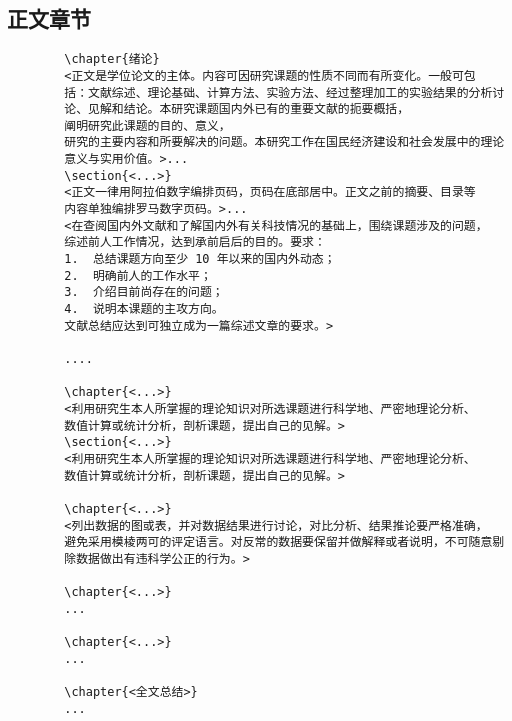 \documentclass[figurelist,tablelist,algorithmlist,nomlist,masters]{seuthesix}
\begin{document}
	\subsection{正文章节}
	{\color{magenta}
		\begin{verbatim}
		\chapter{绪论}
		<正文是学位论文的主体。内容可因研究课题的性质不同而有所变化。一般可包
		括：文献综述、理论基础、计算方法、实验方法、经过整理加工的实验结果的分析讨
		论、见解和结论。本研究课题国内外已有的重要文献的扼要概括，
		阐明研究此课题的目的、意义，
		研究的主要内容和所要解决的问题。本研究工作在国民经济建设和社会发展中的理论
		意义与实用价值。>...
		\section{<...>}
		<正文一律用阿拉伯数字编排页码，页码在底部居中。正文之前的摘要、目录等
		内容单独编排罗马数字页码。>...
		<在查阅国内外文献和了解国内外有关科技情况的基础上，围绕课题涉及的问题，
		综述前人工作情况，达到承前启后的目的。要求：
		1.  总结课题方向至少 10 年以来的国内外动态；
		2.  明确前人的工作水平；
		3.  介绍目前尚存在的问题；
		4.  说明本课题的主攻方向。
		文献总结应达到可独立成为一篇综述文章的要求。>

		....

		\chapter{<...>}
		<利用研究生本人所掌握的理论知识对所选课题进行科学地、严密地理论分析、
		数值计算或统计分析，剖析课题，提出自己的见解。>
		\section{<...>}
		<利用研究生本人所掌握的理论知识对所选课题进行科学地、严密地理论分析、
		数值计算或统计分析，剖析课题，提出自己的见解。>

		\chapter{<...>}
		<列出数据的图或表，并对数据结果进行讨论，对比分析、结果推论要严格准确，
		避免采用模棱两可的评定语言。对反常的数据要保留并做解释或者说明，不可随意剔
		除数据做出有违科学公正的行为。>

		\chapter{<...>}
		...

		\chapter{<...>}
		...

		\chapter{<全文总结>}
		...

		\end{verbatim}
	}
\end{document}
